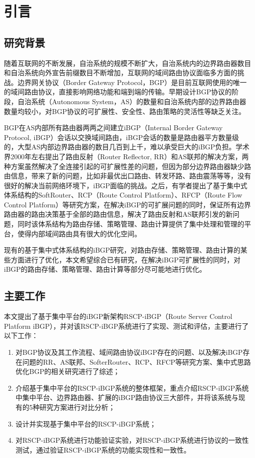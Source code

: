 \chapter{引言}
\label{cha:intro}


\section{研究背景}

随着互联网的不断发展，自治系统的规模不断扩大，自治系统内的边界路由器数目和自治系统向外宣告前缀数目不断增加，互联网的域间路由协议面临多方面的挑战。边界网关协议（Border Gateway Protocol，BGP）是目前互联网使用的唯一的域间路由协议，直接影响网络功能和端到端的传输。早期设计BGP协议的阶段，自治系统（Autonomous System，AS）的数量和自治系统内部的边界路由器数量均较小，对BGP协议的可扩展性、安全性、路由策略的灵活性等缺乏关注。

BGP在AS内部所有路由器两两之间建立iBGP（Internal Border Gateway Protocol, iBGP）会话以交换域间路由，iBGP会话的数量是路由器平方数量级的，大型AS内部边界路由器的数目几百到上千，难以承受巨大的iBGP负担。学术界2000年左右提出了路由反射（Router Reflector, RR）和AS联邦的解决方案，两种方案虽然解决了全连接引起的可扩展性差的问题，但因为部分边界路由器缺少路由信息，带来了新的问题，比如非最优出口路由、转发环路、路由震荡等等，没有很好的解决当前网络环境下，iBGP面临的挑战。之后，有学者提出了基于集中式体系结构的SoftRouter、RCP（Route Control Platform）、RFCP（Route Flow Control Platform）等研究方案，在解决iBGP的可扩展问题的同时，保证所有边界路由器的路由决策基于全部的路由信息，解决了路由反射和AS联邦引发的新问题，同时该体系结构为路由存储、策略管理、路由计算提供了集中处理和管理的平台，使得内部域间路由具有很大的优化空间。

现有的基于集中式体系结构的iBGP研究，对路由存储、策略管理、路由计算的某些方面进行了优化，本文希望综合已有研究，在解决iBGP可扩展性的同时，对iBGP的路由存储、策略管理、路由计算等部分尽可能地进行优化。

\section{主要工作}

本文提出了基于集中平台的iBGP新架构RSCP-iBGP（Route Server Control Platform iBGP），并对该RSCP-iBGP系统进行了实现、测试和评估，主要进行了以下工作：
\begin{enumerate}
\item 对BGP协议及其工作流程、域间路由协议iBGP存在的问题、以及解决iBGP存在问题的RR、AS联邦、SofterRouter、RCP、RFCP等研究方案、集中式思路优化BGP的相关研究进行了综述；
\item 介绍基于集中平台的RSCP-iBGP系统的整体框架，重点介绍RSCP-iBGP系统中集中平台、边界路由器、扩展的iBGP路由协议三大部件，并将该系统与现有的5种研究方案进行对比分析；
\item 设计并实现基于集中平台的RSCP-iBGP系统；
\item 对RSCP-iBGP系统进行功能验证实验，对RSCP-iBGP系统进行协议的一致性测试，通过验证RSCP-iBGP系统的功能实现性和一致性。
\end{enumerate}



